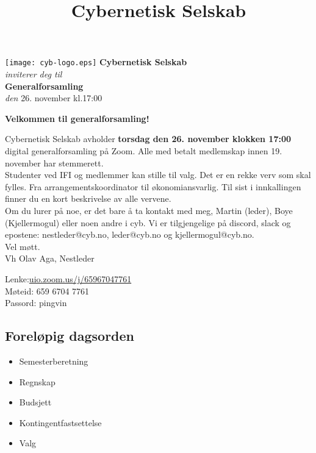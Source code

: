 \documentclass[12pt, norsk, a4paper]{proc}
\title{Cybernetisk Selskab}
\providecommand{\tightlist}{%
  \setlength{\itemsep}{0pt}\setlength{\parskip}{0pt}}
\begin{document}
   \begin{strip}
   \begin{center}
   \texttt{[image: cyb-logo.eps]} 
    \Large\textbf{Cybernetisk Selskab}\\
    \textit{inviterer deg til}\\
    \large\textbf{Generalforsamling} \\
    \emph{den} 
    \large 26. november kl.17:00 \\
   \end{center}
   \end{strip}

\textbf{Velkommen til generalforsamling!}

Cybernetisk Selskab avholder \textbf{torsdag den 26. november klokken 17:00} digital generalforsamling på Zoom. Alle med betalt medlemskap innen 19.
november har stemmerett.\\

Studenter ved IFI og medlemmer kan stille til valg. Det er en rekke verv
som skal fylles. Fra arrangementskoordinator til økonomiansvarlig. Til
sist i innkallingen finner du en kort beskrivelse av alle vervene.\\

Om du lurer på noe, er det bare å ta kontakt med meg, Martin (leder),
Boye (Kjellermogul) eller noen andre i cyb. Vi er tilgjengelige på
discord, slack og epostene: nestleder@cyb.no, leder@cyb.no og
kjellermogul@cyb.no.\\

Vel møtt.\\

Vh Olav Aga, Nestleder

Lenke:\href{https://uio.zoom.us/j/65967047761?pwd=aXVwajE4V1ZhcG5uRW9SN2VTNnM0Zz09}{uio.zoom.us/j/65967047761}\\
Møteid: 659 6704 7761\\
Passord: pingvin

\hypertarget{foreluxf8pig-dagsorden}{%
\subsection*{Foreløpig dagsorden}\label{foreluxf8pig-dagsorden}}

\begin{itemize}
\tightlist
\item
  Semesterberetning
\item
  Regnskap
\item
  Budsjett
\item
  Kontingentfastsettelse
\item
  Valg
\end{itemize}
\end{document}
